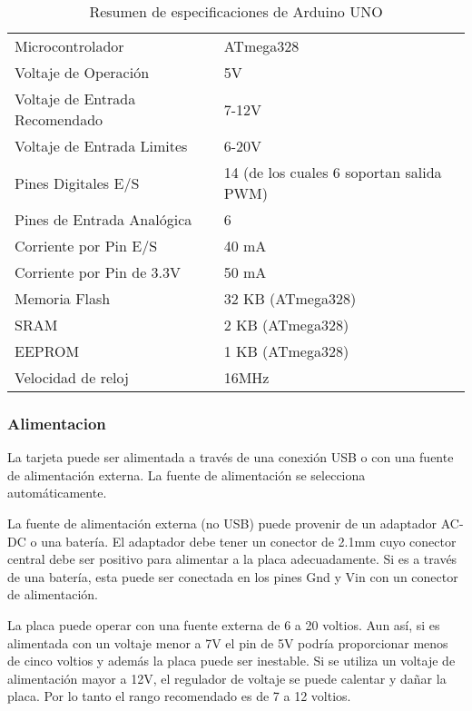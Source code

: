 \begin{table}[t]
    \begin{tabular}{ll}
        \toprule
        Microcontrolador               & ATmega328\\ 
        Voltaje de Operación           & 5V\\ 
        Voltaje de Entrada Recomendado & 7-12V\\ 
        Voltaje de Entrada Limites     & 6-20V\\ 
        Pines Digitales E/S            & 14 (de los cuales 6 soportan salida PWM)\\ 
        Pines de Entrada Analógica     & 6\\ 
        Corriente por Pin E/S          & 40 mA\\ 
        Corriente por Pin de 3.3V      & 50 mA\\ 
        Memoria Flash                  & 32 KB (ATmega328)\\ 
        SRAM                           & 2 KB (ATmega328)\\ 
        EEPROM                         & 1 KB (ATmega328)\\
        Velocidad de reloj & 16MHz\\ \bottomrule
    \end{tabular}
    \caption{Resumen de especificaciones de Arduino UNO}
    \label{tab:arduino_specs}
\end{table}


\subsubsection{Alimentacion}
La tarjeta puede ser alimentada a través de una conexión USB o con una fuente de alimentación externa. La fuente de alimentación se selecciona automáticamente.



La fuente de alimentación externa (no USB) puede provenir de un adaptador AC-DC o una batería. El adaptador debe tener un conector de 2.1mm cuyo conector central debe ser positivo para alimentar a la placa adecuadamente. Si es a través de una batería, esta puede ser conectada en los pines Gnd y Vin con un conector de alimentación.


La placa puede operar con una fuente externa de 6 a 20 voltios. Aun así, si es alimentada con un voltaje menor a 7V el pin de 5V podría proporcionar menos de cinco voltios y además la placa puede ser inestable. Si se utiliza un voltaje de alimentación mayor a 12V, el regulador de voltaje se puede calentar y dañar la placa. Por lo tanto el rango recomendado es de 7 a 12 voltios.



